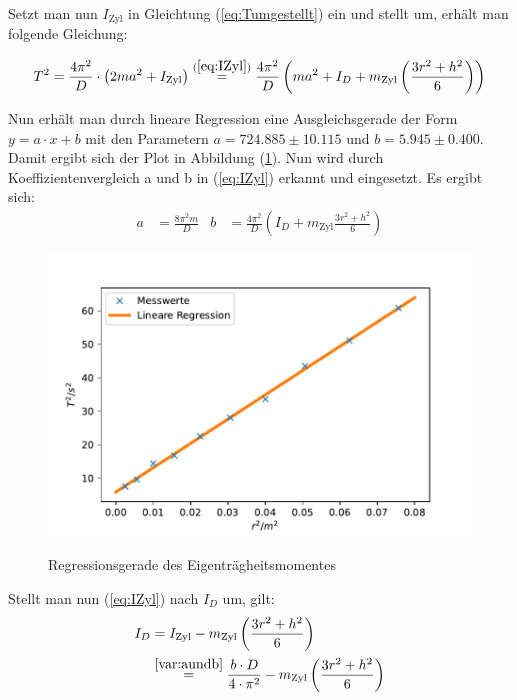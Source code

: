 Setzt man nun $I_{\text{Zyl}}$ in Gleichtung (\ref{eq:Tumgestellt}) ein und stellt um, erhält man folgende Gleichung:

\begin{equation}
  T^2 = \frac{4 \pi^2}{D} \cdot \left( 2ma^2 + I_{\text{Zyl}} \right) \stackrel{(\ref{eq:IZyl})}{=} 
  \frac{4 \pi^2}{D} \left( ma^2 + I_{D} + m_{\text{Zyl}}  \left( \frac{3 r^2 + h^2}{6} \right) \right)
\end{equation}

Nun erhält man durch lineare Regression eine Ausgleichsgerade der Form $y = a \cdot x + b$ mit den Parametern
$a = 724.885 ± 10.115$ und $b = 5.945 ± 0.400$. Damit ergibt sich der Plot in Abbildung (\ref{fig:Lineareregression}).
Nun wird durch Koeffizientenvergleich a und b in (\ref{eq:IZyl}) erkannt und eingesetzt.
Es ergibt sich:
\begin{align} \label{var:aundb}
  a & = \frac{8 \pi^2 m}{D} & b & = \frac{4 \pi^2}{D} \left(I_{D} + m_{\text{Zyl}} \frac{3 r^2 + h^2}{6} \right)
\end{align}

\begin{figure}[H]
  \caption{Regressionsgerade des Eigenträgheitsmomentes}
  \centering
  \includegraphics{pictures/Lineare Regression.pdf}
  \label{fig:Lineareregression}
\end{figure}

Stellt man nun (\ref{eq:IZyl}) nach $I_{D}$ um, gilt:
\begin{equation} \label{eq:idgauß}  %
  \begin{split}
  I_{D} {} &= I_{\text{Zyl}} - m_{\text{Zyl}}  \left( \frac{3 r^2 + h^2}{6} \right) \\
    &\stackrel{\ref{var:aundb}}{=} \frac{b \cdot D}{4 \cdot \pi^2} - m_{\text{Zyl}}  \left( \frac{3 r^2 + h^2}{6} \right)
  \end{split}
\end{equation}

